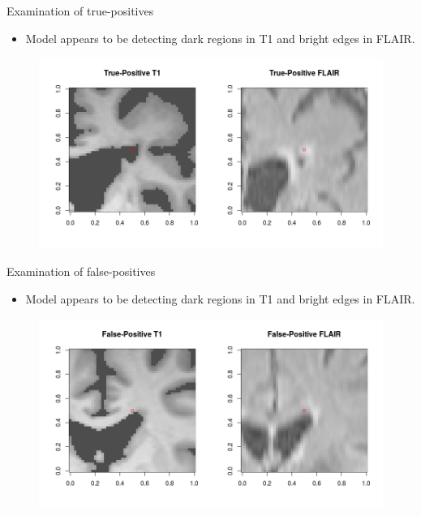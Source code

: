 \documentclass{beamer}
\begin{document}
\begin{frame}{Examination of true-positives}
\begin{itemize}
\item Model appears to be detecting dark regions in T1 and bright edges in FLAIR.
\end{itemize}
\begin{figure}
\centering
\includegraphics[width=\linewidth]{../Thesis_Docs/Images/7_TP_t1_flair.png}
\end{figure}
\end{frame}

\begin{frame}{Examination of false-positives}
\begin{itemize}
\item Model appears to be detecting dark regions in T1 and bright edges in FLAIR.
\end{itemize}
\begin{figure}
\centering
\includegraphics[width=\linewidth]{../Thesis_Docs/Images/7_FP_t1_flair2.png}
\end{figure}
\end{frame}
\end{document}
